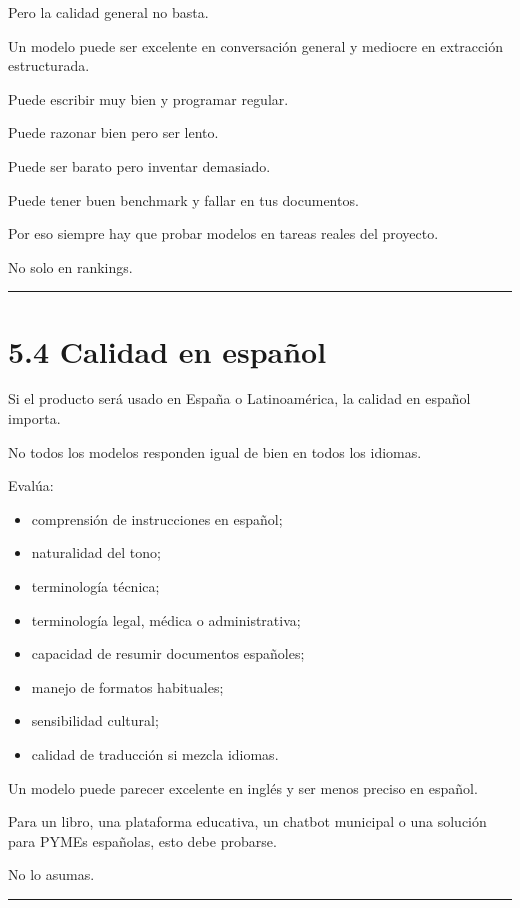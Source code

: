 Pero la calidad general no basta.

Un modelo puede ser excelente en conversación general y mediocre en
extracción estructurada.

Puede escribir muy bien y programar regular.

Puede razonar bien pero ser lento.

Puede ser barato pero inventar demasiado.

Puede tener buen benchmark y fallar en tus documentos.

Por eso siempre hay que probar modelos en tareas reales del proyecto.

No solo en rankings.

\begin{center}\rule{0.5\linewidth}{0.5pt}\end{center}

\section{5.4 Calidad en español}\label{calidad-en-espauxf1ol}

Si el producto será usado en España o Latinoamérica, la calidad en
español importa.

No todos los modelos responden igual de bien en todos los idiomas.

Evalúa:

\begin{itemize}
\tightlist
\item
  comprensión de instrucciones en español;
\item
  naturalidad del tono;
\item
  terminología técnica;
\item
  terminología legal, médica o administrativa;
\item
  capacidad de resumir documentos españoles;
\item
  manejo de formatos habituales;
\item
  sensibilidad cultural;
\item
  calidad de traducción si mezcla idiomas.
\end{itemize}

Un modelo puede parecer excelente en inglés y ser menos preciso en
español.

Para un libro, una plataforma educativa, un chatbot municipal o una
solución para PYMEs españolas, esto debe probarse.

No lo asumas.

\begin{center}\rule{0.5\linewidth}{0.5pt}\end{center}

